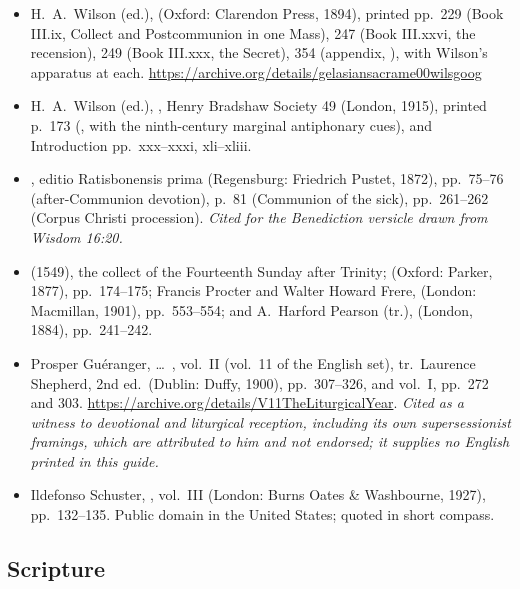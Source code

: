 \begin{itemize}[leftmargin=1.2em, itemsep=0.15em]
{negative for the Secret and Postcommunion.}
\item H.~A.\ Wilson (ed.),  (Oxford: Clarendon Press, 1894), printed
pp.~229 (Book III.ix, Collect and Postcommunion in one Mass), 247 (Book
III.xxvi, the  recension), 249 (Book III.xxx, the Secret), 354
(appendix, ), with Wilson's apparatus at
each. \url{https://archive.org/details/gelasiansacrame00wilsgoog}
\item H.~A.\ Wilson (ed.), , Henry Bradshaw Society 49 (London, 1915), printed p.~173
(, with the ninth-century
marginal antiphonary cues), and Introduction pp.~xxx--xxxi, xli--xliii.
\item {}, editio Ratisbonensis prima (Regensburg:
Friedrich Pustet, 1872), pp.~75--76 (after-Communion devotion), p.~81
(Communion of the sick), pp.~261--262 (Corpus Christi procession).
\textit{Cited for the Benediction versicle drawn from Wisdom 16:20.}
\item {} (1549), the collect of the Fourteenth
Sunday after Trinity;  (Oxford: Parker, 1877), pp.~174--175; Francis
Procter and Walter Howard Frere,  (London: Macmillan, 1901), pp.~553--554; and A.~Harford Pearson (tr.),
 (London, 1884), pp.~241--242.
\item Prosper Guéranger,  \dots\ , vol.~II (vol.~11 of the English set), tr.\ Laurence Shepherd,
2nd ed.\ (Dublin: Duffy, 1900), pp.~307--326, and vol.~I, pp.~272 and 303.
\url{https://archive.org/details/V11TheLiturgicalYear}. \textit{Cited as a
witness to devotional and liturgical reception, including its own
supersessionist framings, which are attributed to him and not endorsed; it
supplies no English printed in this guide.}
\item Ildefonso Schuster, ,
vol.~III (London: Burns Oates \& Washbourne, 1927), pp.~132--135. Public
domain in the United States; quoted in short compass.
\end{itemize}

\subsection*{Scripture}

